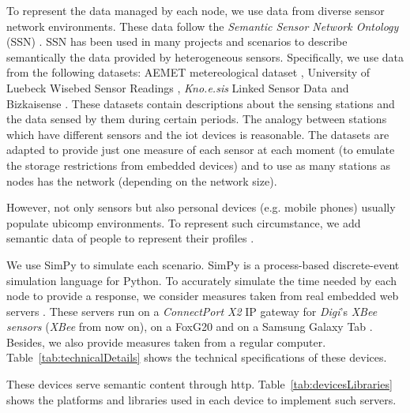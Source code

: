 To represent the data managed by each node, we use data from diverse sensor network environments.
These data follow the \textit{Semantic Sensor Network Ontology} (SSN) .
SSN has been used in many projects and scenarios to describe semantically the data provided by heterogeneous sensors.
Specifically, we use data from the following datasets:
AEMET metereological dataset ,
University of Luebeck Wisebed Sensor Readings ,
\emph{Kno.e.sis} Linked Sensor Data 
and Bizkaisense .
These datasets contain descriptions about the sensing stations and the data sensed by them during certain periods.
The analogy between stations which have different sensors and the \ac{iot} devices is reasonable.
The datasets are adapted to provide just one measure of each sensor at each moment (to emulate the storage restrictions from embedded devices) and to use as many stations as nodes has the network (depending on the network size).

However, not only sensors but also personal devices (e.g. mobile phones) usually populate \ac{ubicomp} environments.
To represent such circumstance, we add semantic data of people to represent their profiles .

We use SimPy  to simulate each scenario.
SimPy is a process-based discrete-event simulation language for Python.
To accurately simulate the time needed by each node to provide a response, we consider measures taken from real embedded web servers \citep{gomez-goiri_restful_2012}.
These servers run on a \textit{ConnectPort X2} IP gateway  for \textit{Digi}'s \textit{XBee sensors}  (\textit{XBee} from now on),
on a FoxG20  and on a Samsung Galaxy Tab .
Besides, we also provide measures taken from a regular computer.
Table~\ref{tab:technicalDetails} shows the technical specifications of these devices.





These devices serve semantic content through \acs{http}.
Table~\ref{tab:devicesLibraries} shows the platforms and libraries used in each device to implement such servers.




